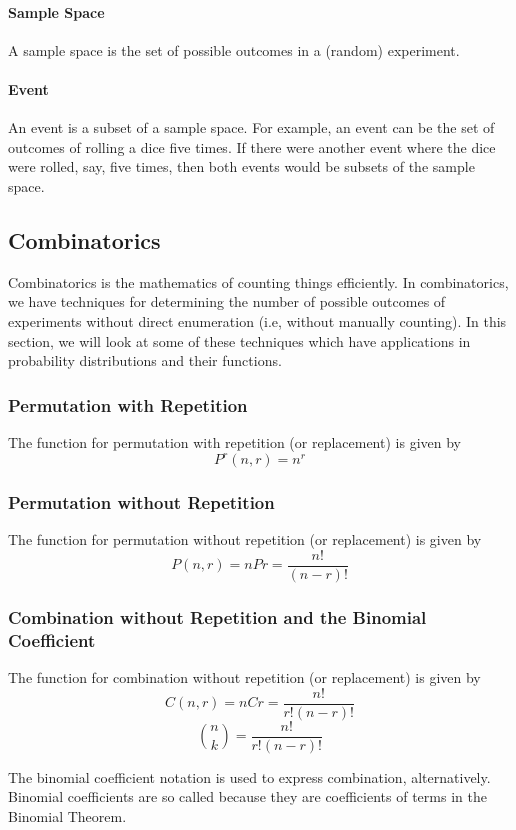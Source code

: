 \documentclass{article}
\begin{document}
\paragraph{Sample Space}
A sample space is the set of possible outcomes in a (random) experiment.

\paragraph{Event}
An event is a subset of a sample space. For example, an event can be the set of outcomes of rolling a dice five times. If there were another event where the dice were rolled, say, five times, then both events would be subsets of the sample space.

\subsection{Combinatorics}
Combinatorics is the mathematics of counting things efficiently. In combinatorics, we have techniques for determining the number of possible outcomes of experiments without direct enumeration (i.e, without manually counting). In this section, we will look at some of these techniques which have applications in probability distributions and their functions.

\subsubsection{Permutation with Repetition}
The function for permutation with repetition (or replacement) is given by
$$ P^{r}(n,r) = n^r  $$

\subsubsection{Permutation without Repetition}
The function for permutation without repetition (or replacement) is given by
$$ P(n,r) = nPr = \frac{n!}{(n-r)!} $$


\subsubsection{Combination without Repetition and the Binomial Coefficient}
The function for combination without repetition (or replacement) is given by
$$ C(n,r) = nCr = \frac{n!}{r!(n-r)!} $$ \hfill \break 
$$ \binom{n}{k} = \frac{n!}{r!(n-r)!} $$ \hfill \break

The binomial coefficient notation is used to express combination, alternatively. Binomial coefficients are so called because they are coefficients of terms in the Binomial Theorem.
\end{document}
